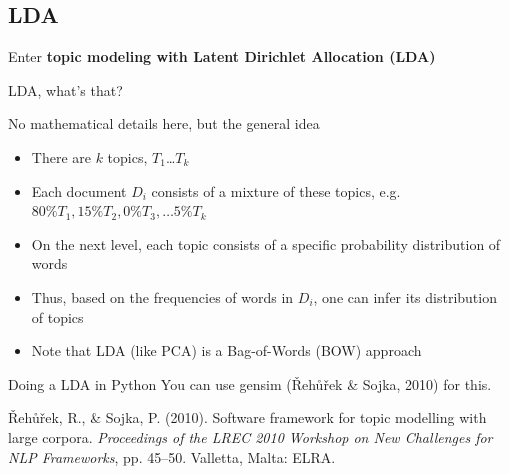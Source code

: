 \documentclass{beamer}
\begin{document}
\subsection{LDA}


\begin{frame}{}
	Enter \textbf{topic modeling with Latent Dirichlet Allocation (LDA)}
\end{frame}








\begin{frame}{LDA, what's that?}
	\begin{block}{No mathematical details here, but the general idea}
		\begin{itemize}
			\item There are $k$ topics, $T_1$\ldots$T_k$
			\item Each document $D_i$ consists of a mixture of these topics, e.g.$80\% T_1, 15\% T_2, 0\% T_3, \ldots 5\% T_k $
			\item On the next level, each topic consists of a specific probability distribution of words
			\item Thus, based on the frequencies of words in $D_i$, one can infer its distribution of topics
			\item Note that LDA (like PCA) is a Bag-of-Words (BOW) approach
		\end{itemize}
	\end{block}
	
\end{frame}




\begin{frame}[fragile]{Doing a LDA in Python}
You can use gensim ({\v R}eh{\r u}{\v r}ek \& Sojka, 2010) for this.
%
%

\tiny{{\v R}eh{\r u}{\v r}ek, R., \& Sojka, P. (2010). Software framework for topic modelling with large corpora. \emph{Proceedings of the LREC 2010 Workshop on New Challenges for NLP Frameworks}, pp. 45–50. Valletta, Malta: ELRA. }
	
\end{frame}
\end{document}
